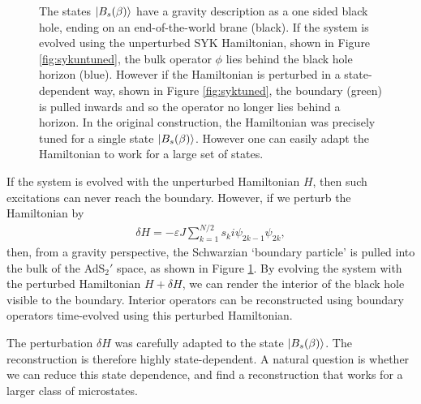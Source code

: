 \documentclass[11pt,a4paper]{article}
\begin{document}
\begin{figure} [t]
\begin{subfigure}{.48\textwidth}
\end{subfigure}
\caption{The states $\ket{B_s(\beta)}$ have a gravity description as a one sided black hole, ending on an end-of-the-world brane (black). If the system is evolved using the unperturbed SYK Hamiltonian, shown in Figure \ref{fig:sykuntuned}, the bulk operator $\phi$ lies behind the black hole horizon (blue). However if the Hamiltonian is perturbed in a state-dependent way, shown in Figure \ref{fig:syktuned}, the boundary (green) is pulled inwards and so the operator no longer lies behind a horizon. In the original construction, the Hamiltonian was precisely tuned for a single state  $\ket{B_s(\beta)}$. However one can easily adapt the Hamiltonian to work for a large set of states.}
\label{fig:SYK}
\end{figure}


If the system is evolved with the unperturbed Hamiltonian $H$, then such excitations can never reach the boundary. However, if we perturb the Hamiltonian by
\begin{align} \label{eq:origpert}
\delta H = - \varepsilon J \sum_{k=1}^{N/2} s_k i \psi_{2k -1} \psi_{2k},
\end{align}
then, from a gravity perspective, the Schwarzian `boundary particle' is pulled into the bulk of the AdS$_2'$ space, as shown in Figure \ref{fig:SYK}. By evolving the system with the perturbed Hamiltonian $H + \delta H$, we can render the interior of the black hole visible to the boundary. Interior operators can be reconstructed using boundary operators time-evolved using this perturbed Hamiltonian.

The perturbation $\delta H$ was carefully adapted to the state $\ket{B_s (\beta)}$. The reconstruction is therefore highly state-dependent. A natural question is whether we can reduce this state dependence, and find a reconstruction that works for a larger class of microstates.
\end{document}
